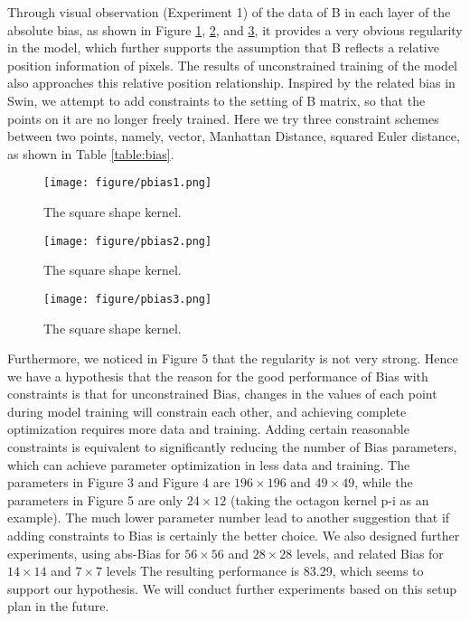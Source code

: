 \documentclass{article}
\theoremstyle{plain}
\theoremstyle{definition}
\theoremstyle{remark}
\begin{document}
Through visual observation (Experiment 1) of the data of B in each layer of the absolute bias, as shown in Figure \ref{fig:pbias1}, \ref{fig:pbias2}, and \ref{fig:pbias3}, it provides a very obvious regularity in the model, which further supports the assumption that B reflects a relative position information of pixels. The results of unconstrained training of the model also approaches this relative position relationship. Inspired by the related bias in Swin, we attempt to add constraints to the setting of B matrix, so that the points on it are no longer freely trained. Here we try three constraint schemes between two points, namely, vector, Manhattan Distance, squared Euler distance, as shown in Table \ref{table:bias}.

\begin{figure}[h]
\centering
    \texttt{[image: figure/pbias1.png]}
\caption{The square shape kernel.}
\label{fig:pbias1}
\end{figure}
\begin{figure}[h]
\centering
    \texttt{[image: figure/pbias2.png]}
\caption{The square shape kernel.}
\label{fig:pbias2}
\end{figure}
\begin{figure}[h]
\centering
    \texttt{[image: figure/pbias3.png]}
\caption{The square shape kernel.}
\label{fig:pbias3}
\end{figure}

Furthermore, we noticed in Figure 5 that the regularity is not very strong. Hence we have a hypothesis that the reason for the good performance of Bias with constraints is that for unconstrained Bias, changes in the values of each point during model training will constrain each other, and achieving complete optimization requires more data and training. Adding certain reasonable constraints is equivalent to significantly reducing the number of Bias parameters, which can achieve parameter optimization in less data and training. The parameters in Figure 3 and Figure 4 are $196\times196$ and $49\times49$, while the parameters in Figure 5 are only $24\times12$ (taking the octagon kernel p-i as an example). The much lower parameter number lead to another suggestion that if adding constraints to Bias is certainly the better choice. We also designed further experiments, using abs-Bias for $56\times56$ and $28\times28$ levels, and related Bias for $14\times14$ and $7\times7$ levels The resulting performance is 83.29, which seems to support our hypothesis. We will conduct further experiments based on this setup plan in the future.
\end{document}
